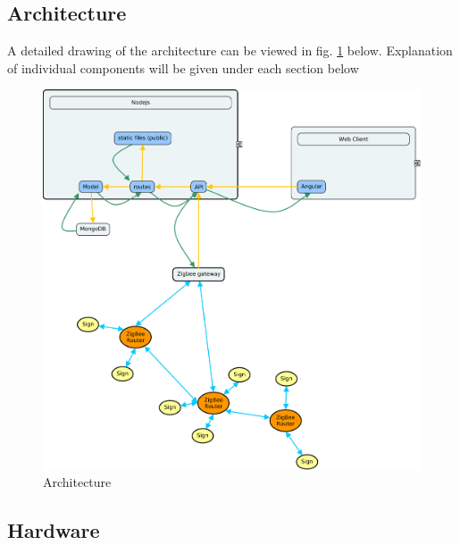 \documentclass[a4paper,12pt,english]{article}
\begin{document}
\subsection{Architecture}
A detailed drawing of the architecture can be viewed in fig. \ref{uml} below.
Explanation of individual components will be given under each section below
\begin{figure}[h]
\includegraphics[scale=0.15	]{img/architecture.png}
\caption{Architecture}
\label{uml}
\end{figure}

\subsection{Hardware}
 
\end{document}
